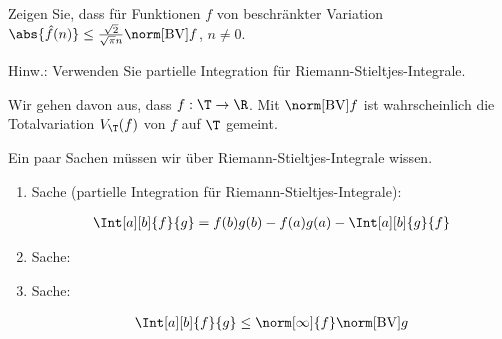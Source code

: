 
\begin{exercise}

Zeigen Sie, dass für Funktionen $f$ von beschränkter Variation $\abs{\hat f(n)} \leq \frac{\sqrt 2}{\sqrt \pi n} \norm[\mathrm{BV}]{f}$, $n \neq 0$.

Hinw.:
Verwenden Sie partielle Integration für Riemann-Stieltjes-Integrale.

\end{exercise}


\begin{solution}

Wir gehen davon aus, dass $f: \T \to \R$.
Mit $\norm[\mathrm{BV}]{f}$ ist wahrscheinlich die Totalvariation $V_\T(f)$ von $f$ auf $\T$ gemeint.


Ein paar Sachen müssen wir über Riemann-Stieltjes-Integrale wissen.

\begin{enumerate}[label = \arabic*.]

    \item Sache (partielle Integration für Riemann-Stieltjes-Integrale):
    
    \begin{align*}
        \Int[a][b]{f}{g}
        =
        f(b) g(b)
        -
        f(a) g(a)
        -
        \Int[a][b]{g}{f}
    \end{align*}

    \item Sache:
    

    \item Sache:
    
    \begin{align*}
        \Int[a][b]{f}{g}
        \leq
        \norm[\infty]{f}
        \norm[\mathrm{BV}]{g}
    \end{align*}


\end{enumerate}
\end{solution}
